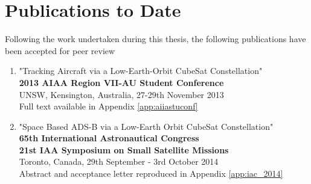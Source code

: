 \section*{Publications to Date}
Following the work undertaken during this thesis, the following publications have been accepted for peer review 
\begin{enumerate}
	\item "Tracking Aircraft via a Low-Earth-Orbit CubeSat Constellation"	\\
		\textbf{2013 AIAA Region VII-AU Student Conference}\\
		UNSW, Kensington, Australia, 27-29th November 2013 \\
		Full text available in Appendix \ref{app:aiiastuconf}
	\item "Space Based ADS-B via a Low-Earth Orbit CubeSat Constellation"	\\
		\textbf{65th International Astronautical Congress}\\
		\textbf{21st IAA Symposium on Small Satellite Missions} \\
		Toronto, Canada, 29th September - 3rd October 2014 \\
		Abstract and acceptance letter reproduced in Appendix \ref{app:iac_2014}
\end{enumerate}
